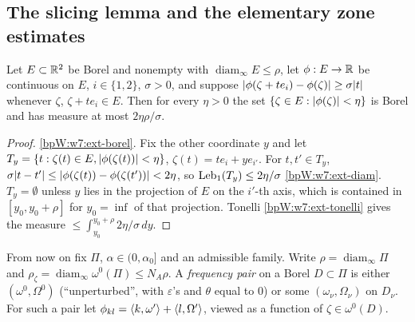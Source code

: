 \subsection{The slicing lemma and the elementary zone estimates}\label{bpW:w7:basic}

\begin{lemma}[Slicing]\label{bpW:w7:slab}
Let $E\subset\mathbb{R}^2$ be Borel and nonempty with $\operatorname{diam}_\infty E\le\rho$, let $\phi:E\to\mathbb{R}$ be continuous
on $E$, $i\in\{1,2\}$, $\sigma>0$, and suppose $\lvert \phi(\zeta+te_i)-\phi(\zeta)\rvert\ge\sigma\lvert t\rvert$ whenever $\zeta$,
$\zeta+te_i\in E$. Then for every $\eta>0$ the set $\{\zeta\in E:\lvert \phi(\zeta)\rvert<\eta\}$ is Borel and has measure
at most $2\eta\rho/\sigma$.
\end{lemma}
\begin{proof}
\label{stepW:w7:slab-borel}
\ref{bpW:w7:ext-borel}.
\label{stepW:w7:slab-line}
Fix the other coordinate $y$ and let $T_y=\{t:\zeta(t)\in E,\lvert \phi(\zeta(t))\rvert<\eta\}$, $\zeta(t)=te_i+ye_{i'}$. For
$t,t'\in T_y$, $\sigma\lvert t-t'\rvert\le\lvert \phi(\zeta(t))-\phi(\zeta(t'))\rvert<2\eta$, so $\operatorname{Leb}_1(T_y)\le2\eta/\sigma$
\ref{bpW:w7:ext-diam}.
\label{stepW:w7:slab-int}
$T_y=\emptyset$ unless $y$ lies in the projection of $E$ on the $i'$-th axis, which is contained in $[y_0,y_0+\rho]$ for
$y_0=\inf$ of that projection. Tonelli \ref{bpW:w7:ext-tonelli} gives the measure
$\le\int_{y_0}^{y_0+\rho}2\eta/\sigma\,dy$.
\end{proof}

From now on fix $\Pi$, $\alpha\in(0,\alpha_0]$ and an admissible family. Write $\rho=\operatorname{diam}_\infty\Pi$ and
$\rho_\zeta=\operatorname{diam}_\infty\omega^0(\Pi)\le N_A\rho$. A \emph{frequency pair} on a Borel $D\subset\Pi$ is
either $(\omega^0,\Omega^0)$ (``unperturbed'', with $\varepsilon$'s and $\theta$ equal to $0$) or some
$(\omega_\nu,\Omega_\nu)$ on $D_\nu$. For such a pair let $\phi_{kl}=\langle k,\omega'\rangle+\langle l,\Omega'\rangle$, viewed as a
function of $\zeta\in\omega^0(D)$.

